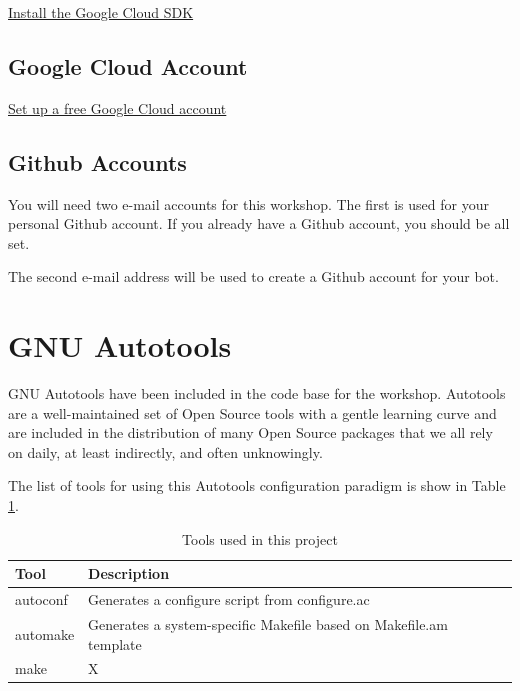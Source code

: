 \href{https://cloud.google.com/sdk/docs/install}{Install the Google Cloud SDK}

\subsection{\label{sec:account}Google Cloud Account}

\justifying

\href{https://cloud.google.com/free/}{Set up a free Google Cloud account}

\subsection{\label{sec:ghaccount}Github Accounts}

\justifying
You will need two e-mail accounts for this workshop. The first is used for your personal Github
account. If you already have a Github account, you should be all set.

\justifying
The second e-mail address will be used to create a Github account for your bot.

\section{\label{sec:autotools}GNU Autotools}

\justifying
GNU Autotools have been included in the code base for the workshop. Autotools are a well-maintained set of Open Source tools with a gentle learning curve and are included in the distribution of many Open Source packages that we all rely on daily, at least indirectly, and often unknowingly.

\justifying
The list of tools for using this Autotools configuration paradigm is show in Table \ref{Autotools}.
\vspace{2mm}

\begin{table}[ht]
	\centering
	\begin{tabular}{|l|l|}\hline
		Tool & Description \\\hline
		autoconf & Generates a configure script from configure.ac   \\\hline
		automake & Generates a system-specific Makefile based on Makefile.am template    \\\hline
		make  &   X    \\\hline
	\end{tabular}
	\caption{Tools used in this project}
	\label{Autotools}
\end{table}
\vspace{2mm}


